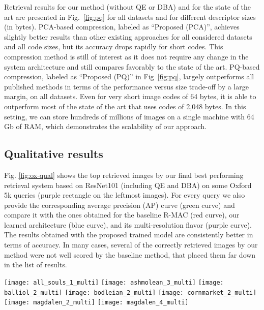 \documentclass[twocolumn]{svjour3}          \smartqed  \usepackage{graphicx}
\begin{document}
Retrieval results for our method (without QE or DBA) and for the state of the art are presented in Fig.~\ref{fig:pq} for all datasets and for different descriptor sizes (in bytes).
PCA-based compression, labeled as ``Proposed (PCA)'', achieves slightly better results than other existing approaches for all considered datasets and all code sizes, but its accuracy drops rapidly for short codes.
This compression method is still of interest as it does not require any change in the system architecture and still 
compares favorably to the state of the art. 
PQ-based compression, labeled as ``Proposed (PQ)'' in Fig~\ref{fig:pq}, largely outperforms all published methods in terms of the performance versus size trade-off by a large margin, on all datasets. 
Even for very short image codes of 64 bytes, it is able to outperform most of the state of the art that uses codes of 2,048 bytes.
In this setting, we can store hundreds of millions of images on a single machine with 64 Gb of RAM, which demonstrates the scalability of our approach.

\subsection{Qualitative results}\label{s:qualitative}
Fig. \ref{fig:ox-qual} shows the top retrieved images by our final best performing retrieval system based on ResNet101 (including QE and DBA) on some Oxford 5k queries (purple rectangle on the leftmost images). For every query we also provide the corresponding average precision (AP) curve (green curve) and compare it with the ones obtained for the baseline R-MAC (red curve), our learned architecture (blue curve), and its multi-resolution flavor (purple curve). The results obtained with the proposed trained model are consistently better in terms of accuracy.
In many cases, several of the correctly retrieved images by our method were not well scored by the baseline method, that placed them far down in the list of results. 



 \begin{figure*}[ht!]
 \begin{centering}
     \texttt{[image: all\_souls\_1\_multi]}
     \texttt{[image: ashmolean\_3\_multi]}
     \texttt{[image: balliol\_2\_multi]}
     \texttt{[image: bodleian\_2\_multi]}
     \texttt{[image: cornmarket\_2\_multi]}
     \texttt{[image: magdalen\_2\_multi]}
     \texttt{[image: magdalen\_4\_multi]}
 \par\end{centering}
 \caption{\label{fig:ox-qual} Top retrieved images and AP curves for a
   few Oxford queries (purple rectangle from leftmost images). On the
   plot, R-MAC baseline is red, our learned version is blue,
   multi-resolution is purple, and the full system with QE and DBA is
   green. Green, gray and red borders on images respectively denote
   positive, null and negative images.}
 \vspace{-0.3cm}
 \end{figure*}
\end{document}
